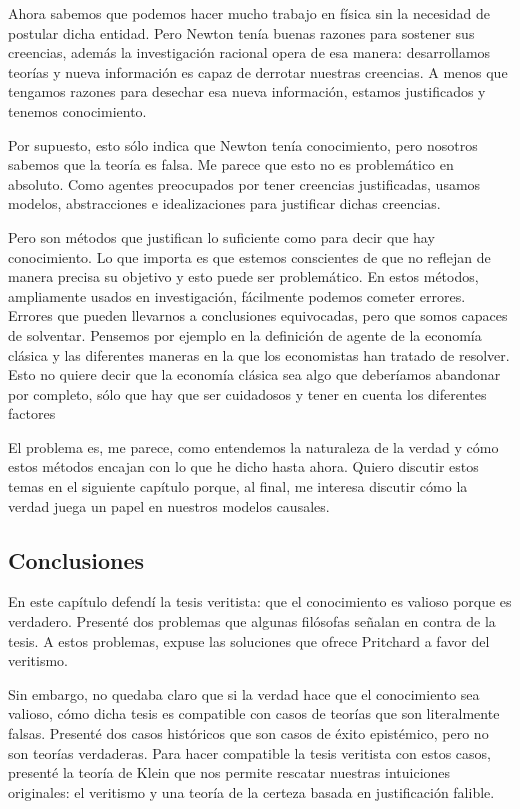 {{{{{Ahora sabemos que podemos hacer mucho trabajo en física sin la necesidad de postular dicha entidad.
Pero Newton tenía buenas razones para sostener sus creencias, además la investigación racional opera de esa manera: desarrollamos teorías y nueva información es capaz de derrotar nuestras creencias.
A menos que tengamos razones para desechar esa nueva información, estamos justificados y tenemos conocimiento.

Por supuesto, esto sólo indica que Newton tenía conocimiento, pero nosotros sabemos que la teoría es falsa.
Me parece que esto no es problemático en absoluto.
Como agentes preocupados por tener creencias justificadas, usamos modelos, abstracciones e idealizaciones para justificar dichas creencias.

Pero son métodos que justifican lo suficiente como para decir que hay conocimiento.
Lo que importa es que estemos conscientes de que no reflejan de manera precisa su objetivo y esto puede ser problemático.
En estos métodos, ampliamente usados en investigación, fácilmente podemos cometer errores.
Errores que pueden llevarnos a conclusiones equivocadas, pero que somos capaces de solventar.
Pensemos por ejemplo en la definición de agente de la economía clásica y las diferentes maneras en la que los economistas han tratado de resolver.
Esto no quiere decir que la economía clásica sea algo que deberíamos abandonar por completo, sólo que hay que ser cuidadosos y tener en cuenta los diferentes factores %

El problema es, me parece, como entendemos la naturaleza de la verdad y cómo estos métodos encajan con lo que he dicho hasta ahora.
Quiero discutir estos temas en el siguiente capítulo porque, al final, me interesa discutir cómo la verdad juega un papel en nuestros modelos causales.

\subsection{Conclusiones}

En este capítulo defendí la tesis veritista: que el conocimiento es valioso porque es verdadero.
Presenté dos problemas que algunas filósofas señalan en contra de la tesis.
A estos problemas, expuse las soluciones que ofrece Pritchard a favor del veritismo.

Sin embargo, no quedaba claro que si la verdad hace que el conocimiento sea valioso, cómo dicha tesis es compatible con casos de teorías que son literalmente falsas.
Presenté dos casos históricos que son casos de éxito epistémico, pero no son teorías verdaderas.
Para hacer compatible la tesis veritista con estos casos, presenté la teoría de Klein que nos permite rescatar nuestras intuiciones originales: el veritismo y una teoría de la certeza basada en justificación falible.

}}}}}

